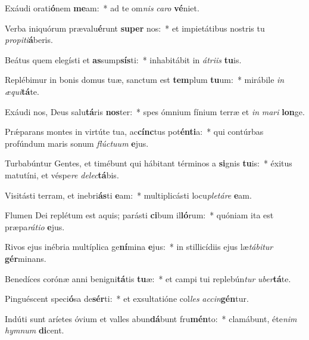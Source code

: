 \item Exáudi orati\textbf{ó}nem \textbf{me}am:~* ad te om\textit{nis} \textit{ca}\textit{ro} \textbf{vé}niet.
\item Verba iniquórum prævalu\textbf{é}runt \textbf{su}\textbf{per} nos:~* et impietátibus nostris tu \textit{pro}\textit{pi}\textit{ti}\textbf{á}beris.
\item Beátus quem elegísti et \textbf{as}sump\textbf{sís}ti:~* inhabitábit in \textit{á}\textit{tri}\textit{is} \textbf{tu}is.
\item Replébimur in bonis domus tuæ, sanctum est \textbf{tem}plum \textbf{tu}um:~* mirábile \textit{in} \textit{æ}\textit{qui}\textbf{tá}te.
\item Exáudi nos, Deus salu\textbf{tá}ris \textbf{nos}ter:~* spes ómnium fínium terræ et \textit{in} \textit{ma}\textit{ri} \textbf{lon}ge.
\item Prǽparans montes in virtúte tua, ac\textbf{cínc}tus pot\textbf{én}\textbf{ti}a:~* qui contúrbas profúndum maris sonum \textit{flúc}\textit{tu}\textit{um} \textbf{e}jus.
\item Turbabúntur Gentes, et timébunt qui hábitant términos a \textbf{si}gnis \textbf{tu}is:~* éxitus matutíni, et véspe\textit{re} \textit{de}\textit{lec}\textbf{tá}bis.
\item Visitásti terram, et inebri\textbf{ás}ti \textbf{e}am:~* multiplicásti locu\textit{ple}\textit{tá}\textit{re} \textbf{e}am.
\item Flumen Dei replétum est aquis; parásti \textbf{ci}bum il\textbf{ló}rum:~* quóniam ita est præpa\textit{rá}\textit{ti}\textit{o} \textbf{e}jus.
\item Rivos ejus inébria multíplica ge\textbf{ní}mina \textbf{e}jus:~* in stillicídiis ejus læ\textit{tá}\textit{bi}\textit{tur} \textbf{gér}minans.
\item Benedíces corónæ anni benigni\textbf{tá}tis \textbf{tu}æ:~* et campi tui replebún\textit{tur} \textit{u}\textit{ber}\textbf{tá}te.
\item Pinguéscent speci\textbf{ó}sa de\textbf{sér}ti:~* et exsultatióne col\textit{les} \textit{ac}\textit{cin}\textbf{gén}tur.
\item Indúti sunt aríetes óvium et valles abun\textbf{dá}bunt fru\textbf{mén}to:~* clamábunt, éte\textit{nim} \textit{hym}\textit{num} \textbf{di}cent.
